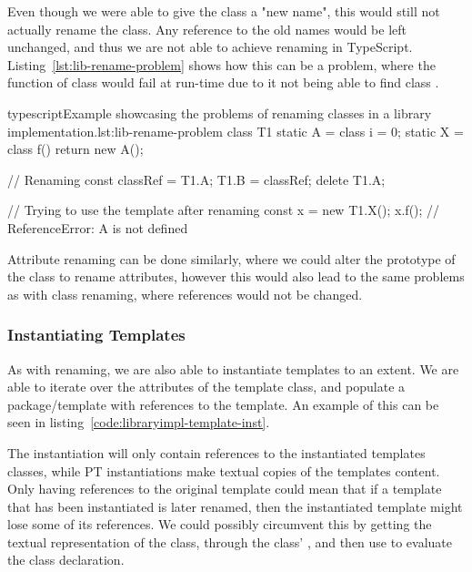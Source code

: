 Even though we were able to give the class a "new name", this would still not actually rename the class.
Any reference to the old names would be left unchanged, and thus we are not able to achieve renaming in TypeScript.
Listing~\vref{lst:lib-rename-problem} shows how this can be a problem, where the function  of class  would fail at run-time due to it not being able to find class .

\begin{code}{typescript}{Example showcasing the problems of renaming classes in a library implementation.}{lst:lib-rename-problem}
    class T1 {
        static A = class {
            i = 0;
        }
        static X = class {
            f() {
                return new A();
            }
        }
    }

   // Renaming
    const classRef = T1.A;
    T1.B = classRef;
    delete T1.A;

    // Trying to use the template after renaming
    const x = new T1.X();
    x.f(); // ReferenceError: A is not defined
\end{code}

Attribute renaming can be done similarly, where we could alter the prototype of the class to rename attributes, however this would also lead to the same problems as with class renaming, where references would not be changed.

\subsubsection{Instantiating Templates}\label{subsubsec:instantiating-templates}

As with renaming, we are also able to instantiate templates to an extent.
We are able to iterate over the attributes of the template class, and populate a package/template with references to the template.
An example of this can be seen in listing~\vref{code:libraryimpl-template-inst}.


The instantiation will only contain references to the instantiated templates classes, while PT instantiations make textual copies of the templates content.
Only having references to the original template could mean that if a template that has been instantiated is later renamed, then the instantiated template might lose some of its references.
We could possibly circumvent this by getting the textual representation of the class, through the class' , and then use  to evaluate the class declaration.


